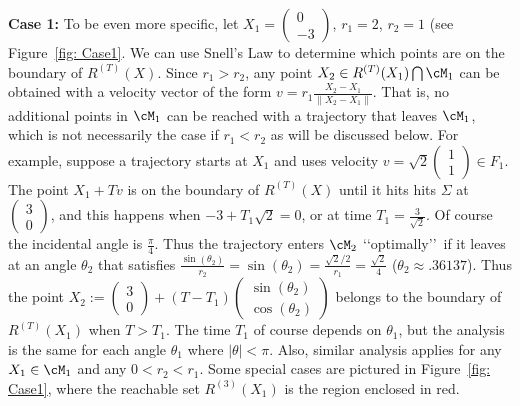 \documentclass[12pt]{article}
\begin{document}
\noindent
{\bf Case 1:}  To be even more specific, let $X_1=\begin{pmatrix}0 \\ -3\end{pmatrix}$, $r_1=2$, $r_2=1$ (see Figure~\ref{fig: Case1}.  
We can use Snell's Law to determine which points are on the boundary of $R^{(T)}(X)$.  Since $r_1>r_2$, any point $X_2\in R^{(T)}(X_1)\bigcap \cM_1$ can be obtained with a velocity vector of the form $v=r_1\frac{X_2-X_1}{\|X_2-X_1\|}$.  
That is, no additional points in $\cM_1$ can be reached with a trajectory that leaves $\cM_1$, which is not necessarily the case if $r_1<r_2$ as will be discussed below.  
For example, suppose a trajectory starts at $X_1$ and uses velocity $v= \sqrt{2}\begin{pmatrix}1 \\ 1\end{pmatrix}\in F_1$.  The point $X_1+Tv$ is on the boundary of $R^{(T)}(X)$ until it hits hits $\Sigma$ at $\begin{pmatrix}3 \\ 0\end{pmatrix}$, and this happens when $-3+T_1\sqrt{2}=0$, or at time $T_1=\frac{3}{\sqrt{2}}$.  Of course the incidental angle is $\frac{\pi}{4}$.  
Thus the trajectory enters $\cM_2$ \lq\lq optimally\rq\rq\ if it leaves at an angle $\theta_2$ that satisfies 
$\frac{\sin(\theta_2)}{r_2}=\sin(\theta_2)=\frac{\sqrt{2}\slash 2}{r_1}=\frac{\sqrt{2}}{4}$ ($\theta_2\approx .36137$).  Thus the point $X_2:=\begin{pmatrix}3 \\ 0\end{pmatrix}+(T-T_1)\begin{pmatrix}\sin(\theta_2) \\ \cos(\theta_2)\end{pmatrix}$ belongs to the boundary of $R^{(T)}(X_1)$ when $T>T_1$.  The time $T_1$ of course depends on $\theta_1$, but the analysis is the same for each angle $\theta_1$ where $|\theta|<\pi$.  
Also, similar analysis applies for any $X_1\in\cM_1$ and any $0<r_2<r_1$.  Some special cases are pictured in Figure~\ref{fig: Case1}, where the reachable set $R^{(3)}(X_1)$ is the region enclosed in red.
\end{document}
